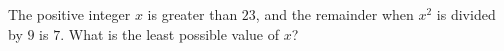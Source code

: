 The positive integer $x$ is greater than $23$, and the remainder when $x^2$ is divided by $9$ is $7$. What is the least possible value of $x$?
